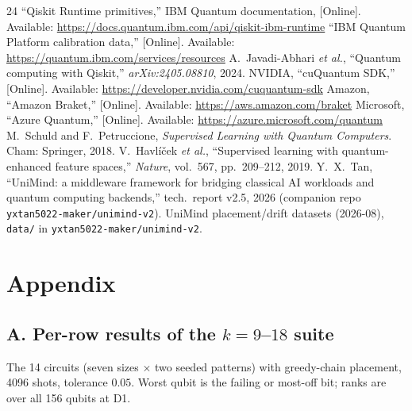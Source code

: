 \documentclass[journal,10pt,twocolumn]{IEEEtran}
\begin{document}
\begin{thebibliography}{24}
 ``Qiskit Runtime primitives,'' IBM Quantum documentation, [Online]. Available: \url{https://docs.quantum.ibm.com/api/qiskit-ibm-runtime}
 ``IBM Quantum Platform calibration data,'' [Online]. Available: \url{https://quantum.ibm.com/services/resources}
 A.~Javadi-Abhari \emph{et al.}, ``Quantum computing with Qiskit,'' \emph{arXiv:2405.08810}, 2024.
 NVIDIA, ``cuQuantum SDK,'' [Online]. Available: \url{https://developer.nvidia.com/cuquantum-sdk}
 Amazon, ``Amazon Braket,'' [Online]. Available: \url{https://aws.amazon.com/braket}
 Microsoft, ``Azure Quantum,'' [Online]. Available: \url{https://azure.microsoft.com/quantum}
 M.~Schuld and F.~Petruccione, \emph{Supervised Learning with Quantum Computers}. Cham: Springer, 2018.
 V.~Havl\'i\v{c}ek \emph{et al.}, ``Supervised learning with quantum-enhanced feature spaces,'' \emph{Nature}, vol.~567, pp.~209--212, 2019.
 Y.~X.~Tan, ``UniMind: a middleware framework for bridging classical AI workloads and quantum computing backends,'' tech.\ report v2.5, 2026 (companion repo \texttt{yxtan5022-maker/unimind-v2}).
 UniMind placement/drift datasets (2026-08), \texttt{data/} in \texttt{yxtan5022-maker/unimind-v2}.
\end{thebibliography}

\newpage
\section*{Appendix}
\subsection*{A. Per-row results of the $k{=}9$--$18$ suite}
\label{app:krows}
The 14 circuits (seven sizes $\times$ two seeded patterns) with greedy-chain placement, 4096 shots, tolerance
$0.05$. Worst qubit is the failing or most-off bit; ranks are over all 156 qubits at D1.
\end{document}
